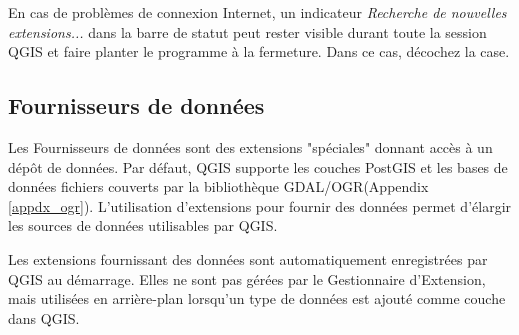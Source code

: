 En cas de problèmes de connexion Internet, un indicateur \textit{Recherche de nouvelles extensions...} dans la barre de statut peut rester visible durant toute la session QGIS et faire planter le programme à la fermeture. Dans ce cas, décochez la case.

%
%

\subsection{Fournisseurs de données}

Les Fournisseurs de données sont des extensions "spéciales" donnant accès à un dépôt de données.
Par défaut, QGIS supporte les couches PostGIS et les bases de données fichiers couverts par la bibliothèque GDAL/OGR(Appendix \ref{appdx_ogr}).
L'utilisation d'extensions pour fournir des données permet d'élargir les sources de données utilisables par QGIS.

Les extensions fournissant des données sont automatiquement enregistrées par QGIS au démarrage.
Elles ne sont pas gérées par le Gestionnaire d'Extension, mais utilisées en arrière-plan lorsqu'un type de données est ajouté comme couche dans QGIS.
